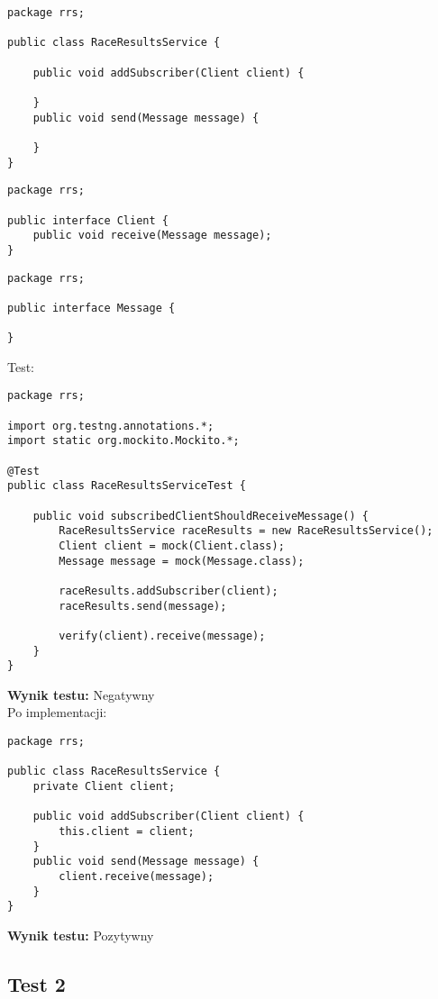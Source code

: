 \documentclass[a4paper,12pt,twoside]{article}
\begin{document}
\medskip
\begin{lstlisting}
package rrs;

public class RaceResultsService {
        
    public void addSubscriber(Client client) {
        
    }
    public void send(Message message) {
        
    }
}
\end{lstlisting}
\begin{lstlisting}
package rrs;

public interface Client {
    public void receive(Message message);
}
\end{lstlisting}
\begin{lstlisting}
package rrs;

public interface Message {
   
}
\end{lstlisting}


\noindent
Test:
\begin{lstlisting}
package rrs;

import org.testng.annotations.*;
import static org.mockito.Mockito.*;

@Test
public class RaceResultsServiceTest {
    
    public void subscribedClientShouldReceiveMessage() {
        RaceResultsService raceResults = new RaceResultsService();
        Client client = mock(Client.class);
        Message message = mock(Message.class);
        
        raceResults.addSubscriber(client);
        raceResults.send(message);
        
        verify(client).receive(message);
    }
}
\end{lstlisting}
\textbf{Wynik testu: }{\color{red} Negatywny}\\

\noindent
Po implementacji:
\begin{lstlisting}
package rrs;

public class RaceResultsService {
    private Client client; 
    
    public void addSubscriber(Client client) {
        this.client = client;
    }
    public void send(Message message) {
        client.receive(message);
    }
}
\end{lstlisting}

\noindent
\textbf{Wynik testu: }{\color{green} Pozytywny}
\subsection{Test 2}
\end{document}
